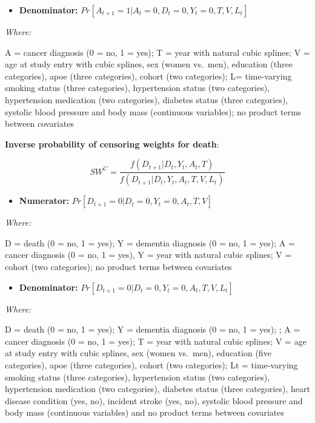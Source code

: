 \documentclass[
]{book}
\providecommand{\tightlist}{%
  \setlength{\itemsep}{0pt}\setlength{\parskip}{0pt}}
\begin{document}
\begin{itemize}
\tightlist
\item
  \textbf{Denominator:} \(Pr[A_{t+1} = 1| A_t = 0, D_t = 0, Y_t = 0, T, V, L_t]\)
\end{itemize}

\emph{Where:}

A = cancer diagnosis (0 = no, 1 = yes); T = year with natural cubic splines; V = age at study entry with cubic splines, sex (women vs.~men), education (three categories), apoe (three categories), cohort (two categories); L= time-varying smoking status (three categories), hypertension status (two categories), hypertension medication (two categories), diabetes status (three categories), systolic blood pressure and body mass (continuous variables); no product terms between covariates

\textbf{Inverse probability of censoring weights for death}:

\[SW^C = \frac{f(D_{t+1}|D_t, Y_t, A_t, T)}{f(D_{t+1}|D_t, Y_t, A_t, T, V, L_t)}\]

\begin{itemize}
\tightlist
\item
  \textbf{Numerator:} \(Pr[D_{t+1} = 0|D_t = 0, Y_t = 0, A_t, T, V]\)
\end{itemize}

\emph{Where:}

D = death (0 = no, 1 = yes); Y = dementia diagnosis (0 = no, 1 = yes); A = cancer diagnosis (0 = no, 1 = yes), Y = year with natural cubic splines; V = cohort (two categories); no product terms between covariates

\begin{itemize}
\tightlist
\item
  \textbf{Denominator:} \(Pr[D_{t+1} = 0|D_t = 0, Y_t = 0, A_t, T, V, L_t]\)
\end{itemize}

\emph{Where:}

D = death (0 = no, 1 = yes); Y = dementia diagnosis (0 = no, 1 = yes); ; A = cancer diagnosis (0 = no, 1 = yes); T = year with natural cubic splines; V = age at study entry with cubic splines, sex (women vs.~men), education (five categories), apoe (three categories), cohort (two categories); Lt = time-varying smoking status (three categories), hypertension status (two categories), hypertension medication (two categories), diabetes status (three categories), heart disease condition (yes, no), incident stroke (yes, no), systolic blood pressure and body mass (continuous variables) and no product terms between covariates
\end{document}
